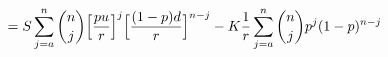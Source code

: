 \documentclass[preview]{standalone}
\begin{document}
\begin{align*}
= S \sum^{n}_{j=a} {{n}\choose{j}} \Big[ { p u \over r } \Big]^{j} \Big[ { (1-p) d \over r } \Big]^{n-j} - K {1 \over r} \sum^{n}_{j=a} {{n}\choose{j}} p^{j} (1-p)^{n-j}
\end{align*}
\end{document}
